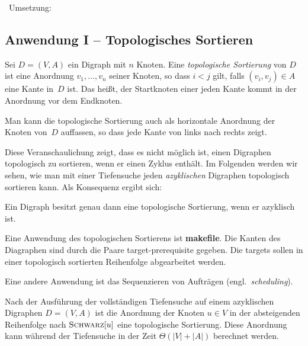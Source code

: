 \begin{bem}\ Umsetzung: 

\end{bem} 


\subsection{Anwendung I -- Topologisches Sortieren}

\begin{defn} 
Sei $D=(V,A)$ ein Digraph mit $n$ Knoten.
Eine \emph{topologische Sortierung} von $D$ ist eine Anordnung $v_1,\ldots,v_n$ seiner Knoten, so dass $i < j$ gilt, falls $(v_i,v_j) \in A$ eine Kante in~$D$ ist.
Das heißt, der Startknoten einer jeden Kante kommt in der Anordnung vor dem Endknoten.
\end{defn} 

\begin{bem}
Man kann die topologische Sortierung auch als horizontale Anordnung der Knoten von~$D$ auffassen, so dass jede Kante von links nach rechts zeigt.

Diese Veranschaulichung zeigt, dass es nicht möglich ist, einen Digraphen topologisch zu sortieren, wenn er einen Zyklus enthält.
Im Folgenden werden wir sehen, wie man mit einer Tiefensuche jeden \emph{azyklischen} Digraphen topologisch sortieren kann.
Als Konsequenz ergibt sich:
\end{bem} 

\begin{prop}
Ein Digraph besitzt genau dann eine topologische Sortierung, wenn er azyklisch ist.
\end{prop}

\begin{bem}
	Eine Anwendung des topologischen Sortierens ist \textbf{makefile}. Die Kanten des Diagraphen sind durch  die Paare target-prerequisite gegeben. Die targets sollen in einer topologisch sortierten Reihenfolge abgearbeitet werden. 
	
	Eine andere Anwendung ist das Sequenzieren von Aufträgen (engl.~\emph{scheduling}).
\end{bem}


\begin{thm}
	Nach der Ausführung der vollständigen Tiefensuche auf einem azyklischen Digraphen $D=(V,A)$ ist die Anordnung der Knoten $u \in V$ in der absteigenden Reihenfolge nach $\mathop{\text{\textsc{Schwarz}}}[u]$ eine topologische Sortierung. Diese Anordnung kann während der Tiefensuche in der Zeit $\Theta(|V|+|A|)$ berechnet werden. 
\end{thm}

